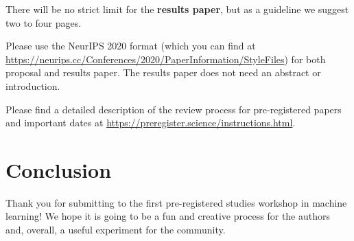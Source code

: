 \documentclass{article}
\begin{document}
There will be no strict limit for the \textbf{results paper}, but as a guideline we suggest two to four pages.


Please use the NeurIPS 2020 format (which you can find at \url{https://neurips.cc/Conferences/2020/PaperInformation/StyleFiles}) for both proposal and results paper.
The results paper does not need an abstract or introduction.

Please find a detailed description of the review process for pre-registered papers and important dates at \url{https://preregister.science/instructions.html}.

\section{Conclusion}
Thank you for submitting to the first pre-registered studies workshop in machine learning!
We hope it is going to be a fun and creative process for the authors and, overall, a useful experiment for the community.


{\small

}
\end{document}

